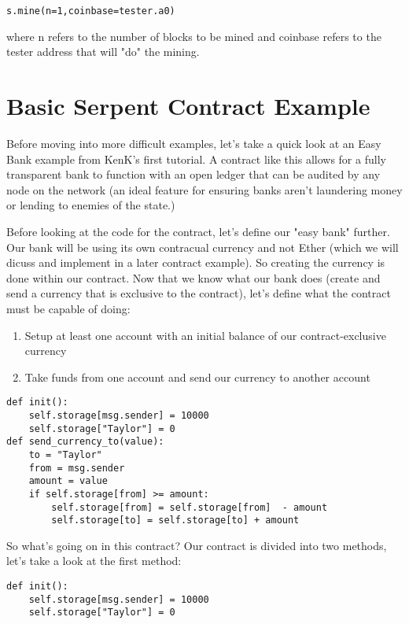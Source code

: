 \documentclass[12pt]{article}
\begin{document}
\begin{lstlisting}
s.mine(n=1,coinbase=tester.a0)
\end{lstlisting}

where n refers to the number of blocks to be mined and coinbase refers to the tester address that will "do" the mining. \cite{Using pyethereum.tester}

\section{Basic Serpent Contract Example}
Before moving into more difficult examples, let's take a quick look at an Easy Bank example from KenK's first tutorial. A contract like this allows for a fully transparent bank to function with an open ledger that can be audited by any node on the network (an ideal feature for ensuring banks aren't laundering money or lending to enemies of the state.)

Before looking at the code for the contract, let's define our "easy bank" further. Our bank will be using its own contracual currency and not Ether (which we will dicuss and implement in a later contract example). So creating the currency is done within our contract. Now that we know what our bank does (create and send a currency that is exclusive to the contract), let's define what the contract must be capable of doing:
\begin{enumerate}
\item Setup at least one account with an initial balance of our contract-exclusive currency
\item Take funds from one account and send our currency to another account
\end{enumerate}


\begin{lstlisting}[frame=single]
def init():
	self.storage[msg.sender] = 10000
	self.storage["Taylor"] = 0
def send_currency_to(value):
	to = "Taylor"
	from = msg.sender
	amount = value
	if self.storage[from] >= amount:
		self.storage[from] = self.storage[from]  - amount
		self.storage[to] = self.storage[to] + amount
\end{lstlisting}
		
		
So what's going on in this contract?
Our contract is divided into two methods, let's take a look at the first method:

\begin{lstlisting}
def init():
	self.storage[msg.sender] = 10000
	self.storage["Taylor"] = 0
\end{lstlisting}
	
\end{document}
